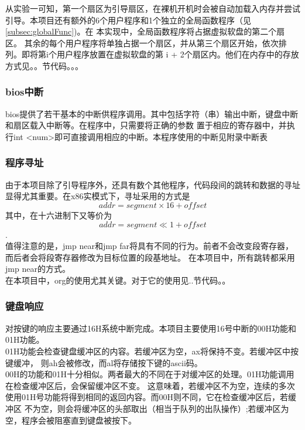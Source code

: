 \documentclass[a4paper]{article}
\newcommand{\codev}[1]{\textsf{#1}}
\begin{document}
    从实验一可知，第一个扇区为引导扇区，在裸机开机时会被自动加载入内存并尝试引导。本项目还有额外的6个用户程序和1个独立的全局函数程序（见
    \ref{subsec:globalFunc})。在
    本实现中，全局函数程序将占据虚拟软盘的第二个扇区。
    其余的每个用户程序将单独占据一个扇区，并从第三个扇区开始，依次排列。即将第\codev{i}个用户程序放置在虚拟软盘的第
    \codev{i + 2}个扇区内。他们在内存中的存放方式见。。节代码。。。%
    \\
    
    \subsubsection{bios中断}
    bios提供了若干基本的中断供程序调用。其中包括字符（串）输出中断，键盘中断和扇区载入中断等。在程序中，只需要将正确的参数
    置于相应的寄存器中，并执行\codev{int <num>}即可直接调用相应的中断。本程序使用的中断见附录中断表%
    \\
    \subsubsection{程序寻址}
    由于本项目除了引导程序外，还具有数个其他程序，代码段间的跳转和数据的寻址显得尤其重要。在x86实模式下，寻址采用的方式是
    $$ addr = segment \times 16 + offset $$
    其中，在十六进制下又等价为 $$addr = segment \ll 1 + offset$$.
    \\
    
    值得注意的是，\codev{jmp near}和\codev{jmp far}将具有不同的行为。前者不会改变段寄存器，而后者会将段寄存器修改为目标位置的段基地址。
    在本项目中，所有跳转都采用\codev{jmp near}的方式。 \\
    
    在本项目中，\codev{org}的使用尤其关键。对于它的使用见..节代码。。%
    \subsubsection{键盘响应} \label{subsec:kbhandler}
    对按键的响应主要通过16H系统中断完成。本项目主要使用16号中断的00H功能和01H功能。\\ 
    
    01H功能会检查键盘缓冲区的内容。若缓冲区为空，ax将保持不变。若缓冲区中按键缓冲，
    则ah会被修改，而al将存储按下键的ascii码。\\
    
    00H的功能和01H十分相似。两者最大的不同在于对缓冲区的处理。01H功能调用在检查缓冲区后，会保留缓冲区不变。
    这意味着，若缓冲区不为空，连续的多次使用01H号功能将得到相同的返回内容。而00H则不同，它在检查缓冲区后，若缓冲区
    不为空，则会将缓冲区的头部取出（相当于队列的出队操作）;若缓冲区为空，程序会被阻塞直到键盘被按下。\\ 
\end{document}
